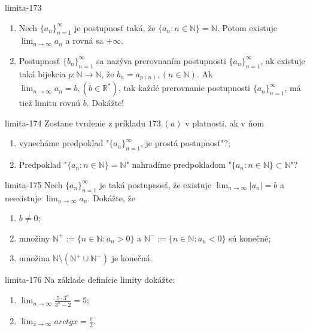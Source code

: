 \begin{defproblem}{limita-173}
\begin{enumerate}
\item Nech ${\{a_n\}}_{n=1}^\infty$ je postupnosť taká, že $\{ a_n: n \in \mathbb{N} \}=\mathbb{N}$. Potom existuje $\lim_{n \rightarrow \infty} a_n$ a rovná sa $+\infty$.
\item Postupnosť ${\{b_n\}}_{n=1}^\infty$ sa nazýva prerovnaním postupnosti ${\{a_n\}}_{n=1}^\infty$, ak existuje taká bijekcia $p: \mathbb{N} \rightarrow \mathbb{N}$, že $b_n=a_{p(n)},(n \in \mathbb{N})$. Ak $\lim_{n \rightarrow \infty} a_n=b,(b \in \mathbb{R^*})$, tak každé prerovnanie postupnosti ${\{a_n\}}_{n=1}^\infty$, má tiež limitu rovnú $b$. Dokážte!
\end{enumerate}
\end{defproblem}

\begin{defproblem}{limita-174}
Zostane tvrdenie z príkladu $173.(a)$  v platnosti, ak v ňom
\begin{enumerate}
\item vynecháme predpoklad "${\{a_n\}}_{n=1}^\infty$, je prostá postupnosť"?;
\item Predpoklad "$\{a_n: n \in \mathbb{N}\}=\mathbb{N}$" nahradíme predpokladom "$\{a_n: n \in \mathbb{N}\} \subset \mathbb{N}$"?
\end{enumerate}
\end{defproblem}

\begin{defproblem}{limita-175}
Nech ${\{a_n\}}_{n=1}^\infty$ je taká postupnosť, že existuje $\lim_{n \rightarrow \infty} |a_n|=b$ a neexistuje $\lim_{n \rightarrow \infty} a_n$. Dokážte, že
\begin{enumerate}
\item $b \neq 0$;
\item množiny $\mathbb{N^+}:= \{n \in \mathbb{N}: a_n>0 \}$ a $\mathbb{N^-}:= \{n \in \mathbb{N}: a_n<0 \}$ sú konečné;
\item množina $\mathbb{N} \setminus (\mathbb{N^+} \cup \mathbb{N^-})$ je konečná.
\end{enumerate}
\end{defproblem}

\begin{defproblem}{limita-176}
Na základe definície limity dokážte:
\begin{multicols}{2}
\begin{enumerate}
    \item $\lim_{n \rightarrow \infty} \frac{5 \cdot 3^n}{3^n-2}=5$;
    \item $\lim_{x \rightarrow \infty} arctg x=\frac{\pi}{2}$.
\end{enumerate}
\end{multicols}
\end{defproblem}

